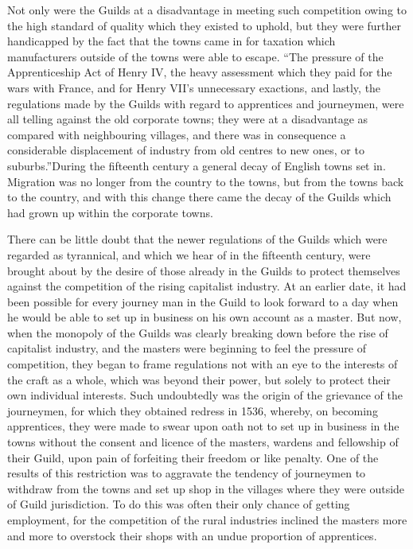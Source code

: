 \documentclass{book}
\begin{document}
Not only were the Guilds at a disadvantage in meeting such competition owing to the high standard of quality which they existed to uphold, but they were further handicapped by the fact that the towns came in for taxation which manufacturers outside of the towns were able to escape. “The pressure of the Apprenticeship Act of Henry IV, the heavy assessment which they paid for the wars with France, and for Henry VII’s unnecessary exactions, and lastly, the regulations made by the Guilds with regard to apprentices and journeymen, were all telling against the old corporate towns; they were at a disadvantage as compared with neighbouring villages, and there was in consequence a considerable displacement of industry from old centres to new ones, or to suburbs.”\footnotemark[1] During the fifteenth century a general decay of English towns set in. Migration was no longer from the country to the towns, but from the towns back to the country, and with this change there came the decay of the Guilds which had grown up within the corporate towns.

There can be little doubt that the newer regulations of the Guilds which were regarded as tyrannical, and which we hear of in the fifteenth century, were brought about by the desire of those already in the Guilds to protect themselves against the competition of the rising capitalist industry. At an earlier date, it had been possible for every journey man in the Guild to look forward to a day when he would be able to set up in business on his own account as a master. But now, when the monopoly of the Guilds was clearly breaking down before the rise of capitalist industry, and the masters were beginning to feel the pressure of competition, they began to frame regulations not with an eye to the interests of the craft as a whole, which was beyond their power, but solely to protect their own individual interests. Such undoubtedly was the origin of the grievance of the journeymen, for which they obtained redress in 1536, whereby, on becoming apprentices, they were made to swear upon oath not to set up in business in the towns without the consent and licence of the masters, wardens and fellowship of their Guild, upon pain of forfeiting their freedom or like penalty. One of the results of this restriction was to aggravate the tendency of journeymen to withdraw from the towns and set up shop in the villages where they were outside of Guild jurisdiction. To do this was often their only chance of getting employment, for the competition of the rural industries inclined the masters more and more to overstock their shops with an undue proportion of apprentices.
\end{document}
